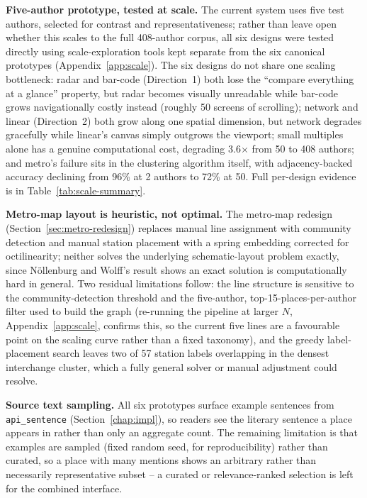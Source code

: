 \documentclass[logo,msc]{infthesis}
\begin{document}
\textbf{Five-author prototype, tested at scale.} The current system uses five test authors, selected for contrast and representativeness; rather than leave open whether this scales to the full 408-author corpus, all six designs were tested directly using scale-exploration tools kept separate from the six canonical prototypes (Appendix~\ref{app:scale}). The six designs do not share one scaling bottleneck: radar and bar-code (Direction~1) both lose the ``compare everything at a glance'' property, but radar becomes visually unreadable while bar-code grows navigationally costly instead (roughly 50 screens of scrolling); network and linear (Direction~2) both grow along one spatial dimension, but network degrades gracefully while linear's canvas simply outgrows the viewport; small multiples alone has a genuine computational cost, degrading 3.6$\times$ from 50 to 408 authors; and metro's failure sits in the clustering algorithm itself, with adjacency-backed accuracy declining from 96\% at 2 authors to 72\% at 50. Full per-design evidence is in Table~\ref{tab:scale-summary}.
 
\textbf{Metro-map layout is heuristic, not optimal.} The metro-map redesign (Section~\ref{sec:metro-redesign}) replaces manual line assignment with community detection and manual station placement with a spring embedding corrected for octilinearity; neither solves the underlying schematic-layout problem exactly, since N{\"o}llenburg and Wolff's result \cite{nollenburg2011} shows an exact solution is computationally hard in general. Two residual limitations follow: the line structure is sensitive to the community-detection threshold and the five-author, top-15-places-per-author filter used to build the graph (re-running the pipeline at larger $N$, Appendix~\ref{app:scale}, confirms this, so the current five lines are a favourable point on the scaling curve rather than a fixed taxonomy), and the greedy label-placement search leaves two of 57 station labels overlapping in the densest interchange cluster, which a fully general solver or manual adjustment could resolve.

\textbf{Source text sampling.} All six prototypes surface example sentences from \texttt{api\_sentence} (Section~\ref{chap:impl}), so readers see the literary sentence a place appears in rather than only an aggregate count. The remaining limitation is that examples are sampled (fixed random seed, for reproducibility) rather than curated, so a place with many mentions shows an arbitrary rather than necessarily representative subset -- a curated or relevance-ranked selection is left for the combined interface.
 
\end{document}
